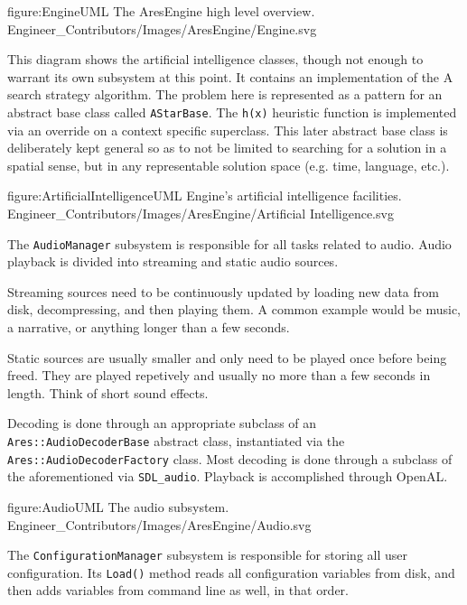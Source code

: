 \FullPageDiagram
    {figure:EngineUML}
    {The AresEngine high level overview.}
    {Engineer_Contributors/Images/AresEngine/Engine.svg}

This diagram shows the artificial intelligence classes, though not enough to warrant its own subsystem at this point. It contains an implementation of the A\high{*} search strategy algorithm. The problem here is represented as a pattern for an abstract base class called {\tt AStarBase}. The {\tt h(x)} heuristic function is implemented via an override on a context specific superclass. This later abstract base class is deliberately kept general so as to not be limited to searching for a solution in a spatial sense, but in any representable solution space (e.g. time, language, etc.).

\FullPageDiagram
    {figure:ArtificialIntelligenceUML}
    {Engine's artificial intelligence facilities.}
    {Engineer_Contributors/Images/AresEngine/Artificial Intelligence.svg}

\page
{}
The {\tt AudioManager} subsystem is responsible for all tasks related to audio. Audio playback is divided into streaming and static audio sources. 

Streaming sources need to be continuously updated by loading new data from disk, decompressing, and then playing them. A common example would be music, a narrative, or anything longer than a few seconds.

Static sources are usually smaller and only need to be played once before being freed. They are played repetively and usually no more than a few seconds in length. Think of short sound effects.

Decoding is done through an appropriate subclass of an {\tt Ares::AudioDecoderBase} abstract class, instantiated via the {\tt Ares::AudioDecoderFactory} class. Most decoding is done through a subclass of the aforementioned via {\tt SDL_audio}. Playback is accomplished through OpenAL.

\FullPageDiagram
    {figure:AudioUML}
    {The audio subsystem.}
    {Engineer_Contributors/Images/AresEngine/Audio.svg}

\page
{}
The {\tt ConfigurationManager} subsystem is responsible for storing all user configuration. Its {\tt Load()} method reads all configuration variables from disk, and then adds variables from command line as well, in that order. 

